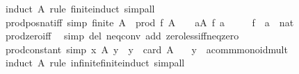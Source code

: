 \begin{isabellebody}
\ {\isacharparenleft}{\kern0pt}induct\ A\ rule{\isacharcolon}{\kern0pt}\ finite{\isacharunderscore}{\kern0pt}induct{\isacharparenright}{\kern0pt}\ simp{\isacharunderscore}{\kern0pt}all%
\endisatagproof
{\isafoldproof}%
%
\isadelimproof
\isanewline
%
\endisadelimproof
\isanewline
{}\isamarkupfalse%
\ prod{\isacharunderscore}{\kern0pt}pos{\isacharunderscore}{\kern0pt}nat{\isacharunderscore}{\kern0pt}iff\ {\isacharbrackleft}{\kern0pt}simp{\isacharbrackright}{\kern0pt}{\isacharcolon}{\kern0pt}\ {\isachardoublequoteopen}finite\ A\ {\isasymLongrightarrow}\ prod\ f\ A\ {\isachargreater}{\kern0pt}\ {}\ {\isasymlongleftrightarrow}\ {\isacharparenleft}{\kern0pt}{\isasymforall}a{\isasymin}A{\isachardot}{\kern0pt}\ f\ a\ {\isachargreater}{\kern0pt}\ {}{\isacharparenright}{\kern0pt}{\isachardoublequoteclose}\isanewline
\ \ \ f\ {\isacharcolon}{\kern0pt}{\isacharcolon}{\kern0pt}\ {\isachardoublequoteopen}{\isacharprime}{\kern0pt}a\ {\isasymRightarrow}\ nat{\isachardoublequoteclose}\isanewline
%
\isadelimproof
\ \ %
\endisadelimproof
%
\isatagproof
{}\isamarkupfalse%
\ prod{\isacharunderscore}{\kern0pt}zero{\isacharunderscore}{\kern0pt}iff\ \isamarkupfalse%
\ {\isacharparenleft}{\kern0pt}simp\ del{\isacharcolon}{\kern0pt}\ neq{}{\isacharunderscore}{\kern0pt}conv\ add{\isacharcolon}{\kern0pt}\ zero{\isacharunderscore}{\kern0pt}less{\isacharunderscore}{\kern0pt}iff{\isacharunderscore}{\kern0pt}neq{\isacharunderscore}{\kern0pt}zero{\isacharparenright}{\kern0pt}%
\endisatagproof
{\isafoldproof}%
%
\isadelimproof
\isanewline
%
\endisadelimproof
\isanewline
{}\isamarkupfalse%
\ prod{\isacharunderscore}{\kern0pt}constant\ {\isacharbrackleft}{\kern0pt}simp{\isacharbrackright}{\kern0pt}{\isacharcolon}{\kern0pt}\ {\isachardoublequoteopen}{\isacharparenleft}{\kern0pt}{\isasymProd}x{\isasymin}\ A{\isachardot}{\kern0pt}\ y{\isacharparenright}{\kern0pt}\ {\isacharequal}{\kern0pt}\ y\ {\isacharcircum}{\kern0pt}\ card\ A{\isachardoublequoteclose}\isanewline
\ \ \ y\ {\isacharcolon}{\kern0pt}{\isacharcolon}{\kern0pt}\ {\isachardoublequoteopen}{\isacharprime}{\kern0pt}a{\isacharcolon}{\kern0pt}{\isacharcolon}{\kern0pt}comm{\isacharunderscore}{\kern0pt}monoid{\isacharunderscore}{\kern0pt}mult{\isachardoublequoteclose}\isanewline
%
\isadelimproof
\ \ %
\endisadelimproof
%
\isatagproof
{}\isamarkupfalse%
\ {\isacharparenleft}{\kern0pt}induct\ A\ rule{\isacharcolon}{\kern0pt}\ infinite{\isacharunderscore}{\kern0pt}finite{\isacharunderscore}{\kern0pt}induct{\isacharparenright}{\kern0pt}\ simp{\isacharunderscore}{\kern0pt}all%

\end{isabellebody}
